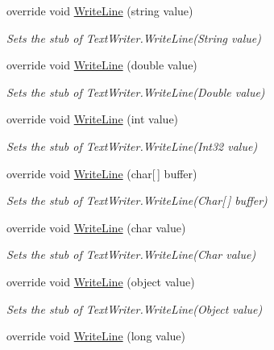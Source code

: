 \begin{DoxyCompactItemize}
override void \hyperlink{class_system_1_1_i_o_1_1_fakes_1_1_stub_text_writer_aead281c69ea07a652ed6ed8618006487}{Write\-Line} (string value)
\begin{DoxyCompactList}\small\item\em Sets the stub of Text\-Writer.\-Write\-Line(\-String value)\end{DoxyCompactList}\item 
override void \hyperlink{class_system_1_1_i_o_1_1_fakes_1_1_stub_text_writer_a0e1ff354b7f2273f612d1f79207084c3}{Write\-Line} (double value)
\begin{DoxyCompactList}\small\item\em Sets the stub of Text\-Writer.\-Write\-Line(\-Double value)\end{DoxyCompactList}\item 
override void \hyperlink{class_system_1_1_i_o_1_1_fakes_1_1_stub_text_writer_ac68ebca6e991d4fe2308b2cc1498fb4b}{Write\-Line} (int value)
\begin{DoxyCompactList}\small\item\em Sets the stub of Text\-Writer.\-Write\-Line(\-Int32 value)\end{DoxyCompactList}\item 
override void \hyperlink{class_system_1_1_i_o_1_1_fakes_1_1_stub_text_writer_ac6ea952e5f996737c660f1a360da3486}{Write\-Line} (char\mbox{[}$\,$\mbox{]} buffer)
\begin{DoxyCompactList}\small\item\em Sets the stub of Text\-Writer.\-Write\-Line(\-Char\mbox{[}$\,$\mbox{]} buffer)\end{DoxyCompactList}\item 
override void \hyperlink{class_system_1_1_i_o_1_1_fakes_1_1_stub_text_writer_a8b0fa6cfb9a2ba1ffe181734a0ac06f7}{Write\-Line} (char value)
\begin{DoxyCompactList}\small\item\em Sets the stub of Text\-Writer.\-Write\-Line(\-Char value)\end{DoxyCompactList}\item 
override void \hyperlink{class_system_1_1_i_o_1_1_fakes_1_1_stub_text_writer_a860c6a916290a6497b99a17d1b3e1065}{Write\-Line} (object value)
\begin{DoxyCompactList}\small\item\em Sets the stub of Text\-Writer.\-Write\-Line(\-Object value)\end{DoxyCompactList}\item 
override void \hyperlink{class_system_1_1_i_o_1_1_fakes_1_1_stub_text_writer_a4c0bd16158c7af03deeeb24852aa7cfc}{Write\-Line} (long value)

\end{DoxyCompactItemize}

